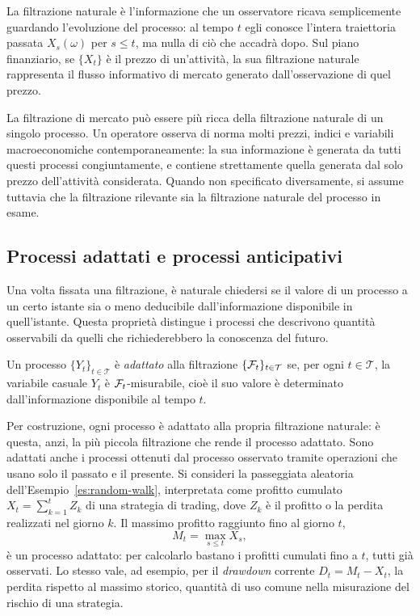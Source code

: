 La filtrazione naturale \`{e} l'informazione che un osservatore
ricava semplicemente guardando l'evoluzione del processo: al tempo
$t$ egli conosce l'intera traiettoria passata $X_s(\omega)$ per
$s\leq t$, ma nulla di ci\`{o} che accadr\`{a} dopo. Sul piano
finanziario, se $\{X_t\}$ \`{e} il prezzo di un'attivit\`{a}, la sua
filtrazione naturale rappresenta il flusso informativo di mercato
generato dall'osservazione di quel prezzo.

\begin{remark}
La filtrazione di mercato pu\`{o} essere pi\`{u} ricca della
filtrazione naturale di un singolo processo. Un operatore osserva di
norma molti prezzi, indici e variabili macroeconomiche
contemporaneamente: la sua informazione \`{e} generata da tutti questi
processi congiuntamente, e contiene strettamente quella generata dal
solo prezzo dell'attivit\`{a} considerata. Quando non specificato
diversamente, si assume tuttavia che la filtrazione rilevante sia la
filtrazione naturale del processo in esame.
\end{remark}

\subsection{Processi adattati e processi anticipativi}

\noindent
Una volta fissata una filtrazione, \`{e} naturale chiedersi se il
valore di un processo a un certo istante sia o meno deducibile
dall'informazione disponibile in quell'istante. Questa propriet\`{a}
distingue i processi che descrivono quantit\`{a} osservabili da quelli
che richiederebbero la conoscenza del futuro.

\begin{definition}
\label{def:adattato}
Un processo $\{Y_t\}_{t\in\mathcal{T}}$ \`{e} \emph{adattato} alla
filtrazione $\{\mathcal{F}_t\}_{t\in\mathcal{T}}$ se, per ogni
$t\in\mathcal{T}$, la variabile casuale $Y_t$ \`{e}
$\mathcal{F}_t$-misurabile, cio\`{e} il suo valore \`{e} determinato
dall'informazione disponibile al tempo $t$.
\end{definition}

Per costruzione, ogni processo \`{e} adattato alla propria filtrazione
naturale: \`{e} questa, anzi, la pi\`{u} piccola filtrazione che rende
il processo adattato. Sono adattati anche i processi ottenuti dal
processo osservato tramite operazioni che usano solo il passato e il
presente. Si consideri la passeggiata aleatoria
dell'Esempio~\ref{es:random-walk}, interpretata come profitto cumulato
$X_t=\sum_{k=1}^{t}Z_k$ di una strategia di trading, dove $Z_k$ \`{e}
il profitto o la perdita realizzati nel giorno $k$. Il massimo
profitto raggiunto fino al giorno $t$,
\[
M_t=\max_{s\leq t}X_s,
\]
\`{e} un processo adattato: per calcolarlo bastano i profitti cumulati
fino a $t$, tutti gi\`{a} osservati. Lo stesso vale, ad esempio, per
il \emph{drawdown} corrente $D_t=M_t-X_t$, la perdita rispetto al
massimo storico, quantit\`{a} di uso comune nella misurazione del
rischio di una strategia.

